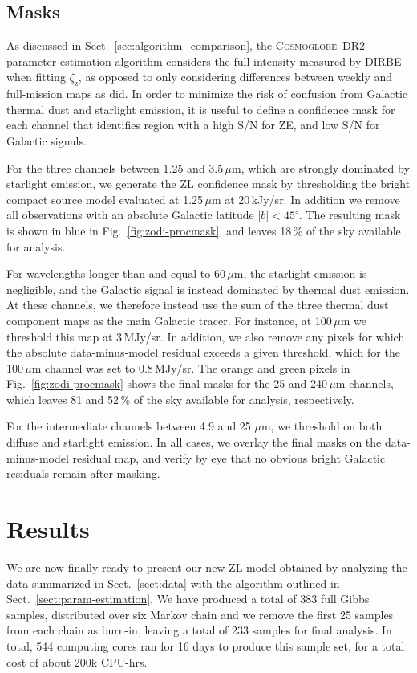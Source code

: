 \documentclass[twocolumn]{aa}
\newcommand{\cosmoglobe}{\textsc{Cosmoglobe}}
\begin{document}
\subsection{Masks}
\label{sec:masks}

As discussed in Sect.~\ref{sec:algorithm_comparison}, the
\cosmoglobe\ DR2 parameter estimation algorithm considers the full
intensity measured by DIRBE when fitting $\zeta_{\mathrm{z}}$, as
opposed to only considering differences between weekly and
full-mission maps as \citet{Kelsall1998} did. In order to minimize the
risk of confusion from Galactic thermal dust and starlight emission,
it is useful to define a confidence mask for each channel that
identifies region with a high S/N for ZE, and low S/N for Galactic
signals.

For the three channels between 1.25 and 3.5\,$\mu$m, which are
strongly dominated by starlight emission, we generate the ZL
confidence mask by thresholding the bright compact source model
evaluated at 1.25\,$\mu$m at 20\,kJy/sr. In addition we remove all
observations with an absolute Galactic latitude $|b|<45^{\circ}$. The
resulting mask is shown in blue in Fig.~\ref{fig:zodi-procmask}, and
leaves 18\,\% of the sky available for analysis.

For wavelengths longer than and equal to 60\,$\mu$m, the starlight
emission is negligible, and the Galactic signal is instead dominated
by thermal dust emission. At these channels, we therefore instead use
the sum of the three thermal dust component maps as the main Galactic
tracer. For instance, at 100$\,\mu$m we threshold this map at
3\,MJy/sr. In addition, we also remove any pixels for which the
absolute data-minus-model residual exceeds a given threshold, which
for the 100$\,\mu$m channel was set to 0.8\,MJy/sr. The orange and
green pixels in Fig.~\ref{fig:zodi-procmask} shows the final masks for
the 25 and 240\,$\mu$m channels, which leaves 81 and 52\,\% of the sky
available for analysis, respectively.

For the intermediate channels between 4.9 and 25\,$\,\mu$m, we
threshold on both diffuse and starlight emission. In all cases, we
overlay the final masks on the data-minus-model residual map, and
verify by eye that no obvious bright Galactic residuals remain after
masking. 


\section{Results}\label{sect:improved-model}
We are now finally ready to present our new ZL model obtained
by analyzing the data summarized in Sect.~\ref{sect:data} with the
algorithm outlined in Sect.~\ref{sect:param-estimation}. We have
produced a total of 383 full Gibbs samples, distributed over six
Markov chain and we remove the first 25 samples from each chain as
burn-in, leaving a total of 233 samples for final analysis. In total,
544 computing cores ran for 16 days to produce this sample set, for a
total cost of about 200k CPU-hrs.
\end{document}
